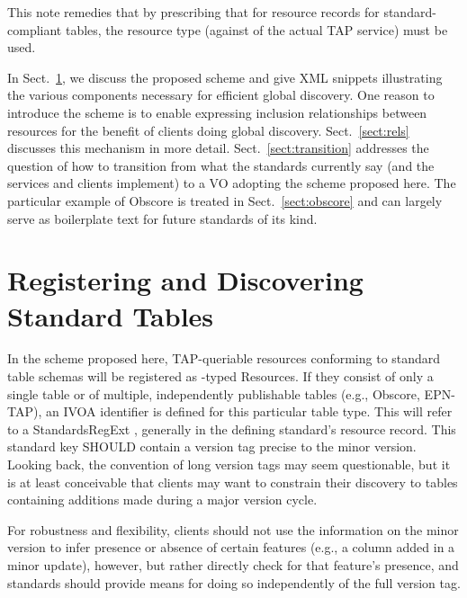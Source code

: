 \documentclass[11pt,a4paper]{ivoa}
\begin{document}
This note remedies that by prescribing that for resource records for
standard-compliant tables, the resource type 
(against  of the actual TAP service) must be used.

In Sect.~\ref{sect:norms}, we discuss the proposed scheme and give
XML snippets illustrating the various components necessary for efficient
global discovery.  One reason to
introduce the scheme is to enable expressing inclusion relationships
between resources for the benefit of clients doing global discovery.
Sect.~\ref{sect:rels} discusses this mechanism in more detail.
Sect.~\ref{sect:transition} addresses the question of how to transition
from what the standards currently say (and the services and clients
implement) to a VO adopting the scheme proposed here.  The particular
example of Obscore is treated in Sect.~\ref{sect:obscore} and can
largely serve as boilerplate text for future standards of its kind.


\section{Registering and Discovering Standard Tables}
\label{sect:norms}

In the scheme proposed here, TAP-queriable resources conforming to
standard table schemas will be registered as
-typed Resources.  If they consist of only a
single table or of multiple, independently publishable tables (e.g.,
Obscore, EPN-TAP), an IVOA identifier \citep{2016ivoa.spec.0523D} is
defined for this particular table type.  This will refer to a StandardsRegExt
\citep{2012ivoa.spec.0508H} , generally in the
defining standard's resource record.  This standard key SHOULD contain a
version tag precise to the minor version.  Looking back, the convention
of long version tags may seem questionable, but it is at least
conceivable that clients may want to constrain their discovery to tables
containing additions made during a major version cycle.

For robustness and flexibility, clients should not use the information
on the minor version to infer presence or absence of certain features
(e.g., a column added in a minor update), however, but rather directly
check for that feature's presence, and standards should provide means
for doing so independently of the full version tag.
\end{document}

